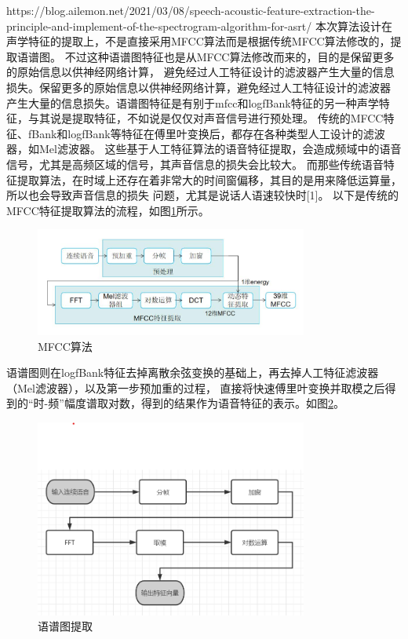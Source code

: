 \documentclass[12pt,a4paper,fancyhdr,openany,oneside]{ctexbook}
\begin{document}
https://blog.ailemon.net/2021/03/08/speech-acoustic-feature-extraction-the-principle-and-implement-of-the-spectrogram-algorithm-for-asrt/
本次算法设计在声学特征的提取上，不是直接采用MFCC算法而是根据传统MFCC算法修改的，提取语谱图。
不过这种语谱图特征也是从MFCC算法修改而来的，目的是保留更多的原始信息以供神经网络计算，
避免经过人工特征设计的滤波器产生大量的信息损失。保留更多的原始信息以供神经网络计算，避免经过人工特征设计的滤波器
产生大量的信息损失。语谱图特征是有别于mfcc和logfBank特征的另一种声学特征，与其说是提取特征，不如说是仅仅对声音信号进行预处理。
传统的MFCC特征、fBank和logfBank等特征在傅里叶变换后，都存在各种类型人工设计的滤波器，如Mel滤波器。
这些基于人工特征算法的语音特征提取，会造成频域中的语音信号，尤其是高频区域的信号，其声音信息的损失会比较大。
而那些传统语音特征提取算法，在时域上还存在着非常大的时间窗偏移，其目的是用来降低运算量，所以也会导致声音信息的损失
问题，尤其是说话人语速较快时[1]。
以下是传统的MFCC特征提取算法的流程，如图\ref{mfcc.png}所示。
\begin{figure}[htbp]
\centering
    \includegraphics[width=0.8\textwidth]{resource/img/mfcc.png}
    \caption{MFCC算法}
    \label{mfcc.png}
\end{figure}

语谱图则在logfBank特征去掉离散余弦变换的基础上，再去掉人工特征滤波器（Mel滤波器），以及第一步预加重的过程，
直接将快速傅里叶变换并取模之后得到的“时-频”幅度谱取对数，得到的结果作为语音特征的表示。如图\ref{spectrogram.png}。
\begin{figure}[htbp]
    \centering
        \includegraphics[width=0.8\textwidth]{resource/img/spectrogram.png}
        \caption{语谱图提取}
        \label{spectrogram.png}
\end{figure}
\end{document}
